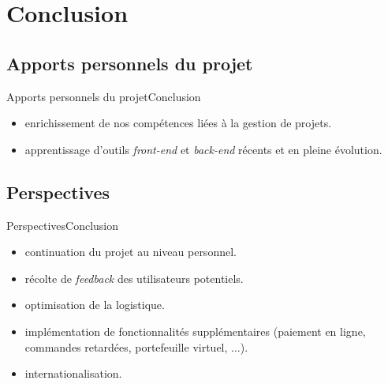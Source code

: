 \documentclass[usenames,dvipsnames]{beamer}
\begin{document}
\section{Conclusion}
\subsection{Apports personnels du projet}
\begin{frame}{Apports personnels du projet}{Conclusion}
  \begin{itemize}
    \item enrichissement de nos compétences liées à la gestion de projets.
    \item apprentissage d'outils \textit{front-end} et \textit{back-end} récents et en pleine évolution.
  \end{itemize}
\end{frame}
\subsection{Perspectives}
\begin{frame}{Perspectives}{Conclusion}
  \begin{itemize}
    \item continuation du projet au niveau personnel.
    \item récolte de \textit{feedback} des utilisateurs potentiels.
    \item optimisation de la logistique.
    \item implémentation de fonctionnalités supplémentaires (paiement en ligne, commandes retardées, portefeuille virtuel, $\dots$).
    \item internationalisation.
 \end{itemize}
\end{frame}
\end{document}
